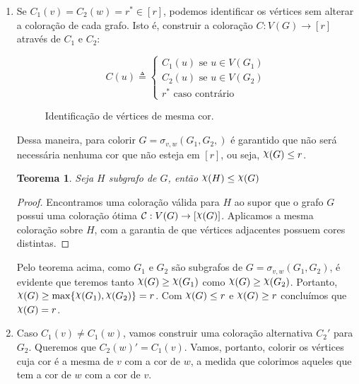 \documentclass{homework}
\newtheorem*{theorem}{Teorema}
\begin{document}
	\begin{enumerate}[label=\Roman*.]
		\item Se $C_1(v) = C_2(w) = r^{\ast} \in [r]$, podemos identificar os vértices sem alterar a coloração de cada grafo. Isto é, construir a coloração $C : V(G) \to [r]$ através de $C_1$ e $C_2$: \par
		
		$$C(u) \triangleq \begin{cases}
		C_1(u) \text{ se } u \in V(G_1)\\
		C_2(u) \text{ se } u \in V(G_2)\\
		r^{\ast} \text{ caso contrário}
		\end{cases}$$
		
		\begin{figure}[H]
			\centering
			
			\caption{Identificação de vértices de mesma cor.}
			\label{fig:2.2}
		\end{figure}
		
		Dessa maneira, para colorir $G = \sigma_{v, w}(G_1, G_2,)$ é garantido que não será necessária nenhuma cor que não esteja em $[r]$, ou seja, $\rchi(G) \le r$. \par
		
		\begin{theorem}
		Seja $H$ subgrafo de $G$, então $\rchi(H) \le \rchi(G)$
		\end{theorem}
		
		\begin{proof}
		Encontramos uma coloração válida para $H$ ao supor que o grafo $G$ possui uma coloração ótima $ \mathcal{C} : V(G) \to [\rchi(G)] $. Aplicamos a mesma coloração sobre $H$, com a garantia de que vértices adjacentes possuem cores distintas. 
		\end{proof}
	
		Pelo teorema acima, como $G_1$ e $G_2$ são subgrafos de $G = \sigma_{v, w}(G_1, G_2)$, é evidente que teremos tanto $\rchi(G) \ge \rchi(G_1)$ como $\rchi(G) \ge \rchi(G_2)$. Portanto, $\rchi(G) \ge \max\{\rchi(G_1), \rchi(G_2)\} = r$. Com $\rchi(G) \le r$ e $\rchi(G) \ge r$ concluímos que $\rchi(G) = r$.
	
		\item Caso $C_1(v) \neq C_1(w)$, vamos construir uma coloração alternativa $C_2'$ para $G_2$. Queremos que $C_2(w)' = C_1(v)$. Vamos, portanto, colorir os vértices cuja cor é a mesma de $v$ com a cor de $w$, a medida que colorimos aqueles que tem a cor de $w$ com a cor de $v$. \par
		

\end{enumerate}
\end{document}
